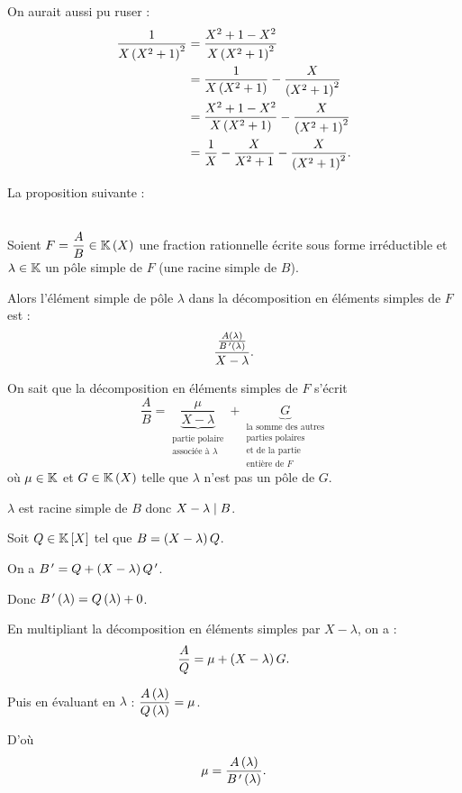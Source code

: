 \begin{rem}[Astuce]
On aurait aussi pu ruser : \[\begin{aligned}
\dfrac{1}{X\left(X^2+1\right)^2}&=\dfrac{X^2+1-X^2}{X\left(X^2+1\right)^2} \\
&=\dfrac{1}{X\left(X^2+1\right)}-\dfrac{X}{\left(X^2+1\right)^2} \\
&=\dfrac{X^2+1-X^2}{X\left(X^2+1\right)}-\dfrac{X}{\left(X^2+1\right)^2} \\
&=\dfrac{1}{X}-\dfrac{X}{X^2+1}-\dfrac{X}{\left(X^2+1\right)^2}.
\end{aligned}\]
\end{rem}

\begin{meth}
La proposition suivante :
\end{meth}

\begin{prop}~\\
Soient \(F=\dfrac{A}{B}\in\fracrat\) une fraction rationnelle écrite sous forme irréductible et \(\lambda\in\mathbb{K}\) un pôle simple de \(F\) (\cad une racine simple de \(B\)).

Alors l'élément simple de pôle \(\lambda\) dans la décomposition en éléments simples de \(F\) est : \[\dfrac{\frac{A\left(\lambda\right)}{B^{\,\prime}\left(\lambda\right)}}{X-\lambda}.\]
\end{prop}

\begin{dem}
On sait que la décomposition en éléments simples de \(F\) s'écrit \[\dfrac{A}{B}=\underbrace{\dfrac{\mu}{X-\lambda}}_{\substack{\text{partie polaire} \\ \text{associée à }\lambda}}+\underbrace{G}_{\substack{\text{la somme des autres} \\ \text{parties polaires} \\ \text{et de la partie} \\ \text{entière de }F}}\] où \(\mu\in\mathbb{K}\) et \(G\in\fracrat\) telle que \(\lambda\) n'est pas un pôle de \(G\).

\(\lambda\) est racine simple de \(B\) donc \(X-\lambda\mid B\).

Soit \(Q\in\poly\) tel que \(B=\left(X-\lambda\right)Q\).

On a \(B^{\,\prime}=Q+\left(X-\lambda\right)Q^{\,\prime}\).

Donc \(B^{\,\prime}\left(\lambda\right)=Q\left(\lambda\right)+0\).

En multipliant la décomposition en éléments simples par \(X-\lambda\), on a : \[\dfrac{A}{Q}=\mu+\left(X-\lambda\right)G.\]

Puis en évaluant en \(\lambda\) : \(\dfrac{A\left(\lambda\right)}{Q\left(\lambda\right)}=\mu\).

D'où \[\mu=\dfrac{A\left(\lambda\right)}{B^{\,\prime}\left(\lambda\right)}.\]
\end{dem}

